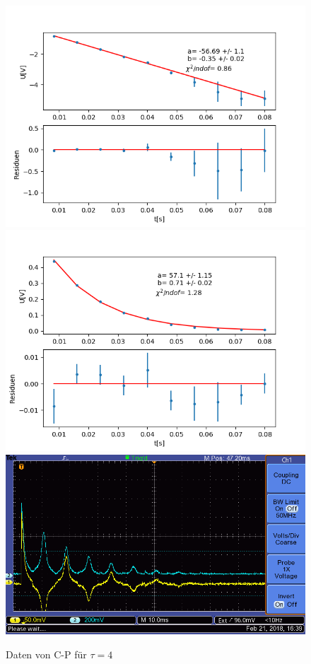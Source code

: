 \documentclass[12pt,a4paper]{article}
\begin{document}
\begin{figure}
\centering
\includegraphics[scale=0.5]{Bilder/T2Anhang/T2CPlinalt.png}
\includegraphics[scale=0.5]{Bilder/T2Anhang/T2CPexpalt.png}
\includegraphics[scale=0.5]{Bilder/T2Anhang/T2CPalt.png}
\caption{Daten von C-P für $\tau = 4$}
\end{figure}
\end{document}

